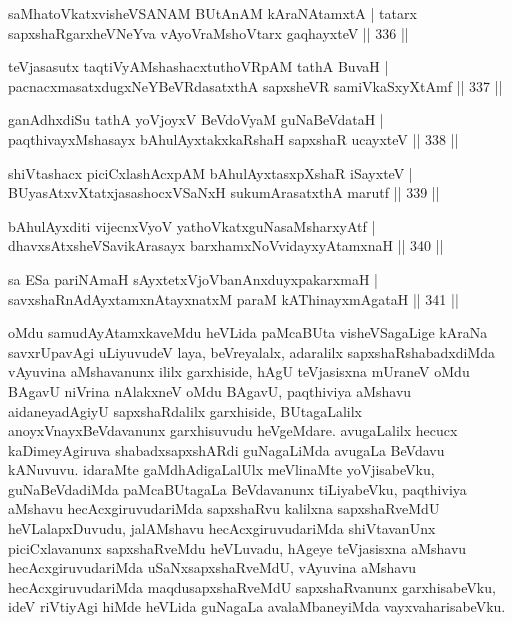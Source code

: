 \begin{shl}
saMhatoVkatxvisheVSANAM BUtAnAM kAraNAtamxtA |
tatarx sapxshaRgarxheVNeYva vAyoVraMshoV\s tarx gaqhayxteV \hfill || 336 ||
\end{shl}

\begin{shl}
teVjasasutx taqtiVyAMshashacxtuthoVR\s pAM tathA BuvaH |
pacnacxmasatxdugxNeYBeVRdasatxthA sapxsheVR samiVkaSxyXtAmf \hfill || 337 ||
\end{shl}

\begin{shl}
ganAdhxdiSu tathA yoVjoyxV BeVdoV\s yaM guNaBeVdataH |
paqthivayxMshasayx bAhulAyxtakxkaRshaH sapxshaR ucayxteV \hfill || 338 ||
\end{shl}

\begin{shl}
shiVtashacx piciCxlashAcxpAM bAhulAyxtasxpXshaR iSayxteV |
BUyasAtxvXtatxjasashocxVSaNxH sukumArasatxthA marutf \hfill || 339 ||
\end{shl}

\begin{shl}
bAhulAyxditi vijecnxVyoV yathoVkatxguNasaMsharxyAtf |
dhavxsAtxsheVSavikArasayx barxhamxNoV\s vidayxyA\s \s tamxnaH \hfill || 340 ||
\end{shl}

\begin{shl}
sa ESa pariNAmaH sAyxtetxVjoVbanAnxduyxpakarxmaH |
savxshaRnAdAyxtamxnA\s tayxnatxM paraM kAThinayxmAgataH \hfill || 341 ||
\end{shl}

\begin{artha}
oMdu samudAyAtamxkaveMdu heVLida paMcaBUta visheVSagaLige kAraNa \break savxrUpavAgi uLiyuvudeV laya, beVreyalalx, adaralilx \footnotemark[1]sapxshaRshabadxdiMda vAyu\-vina aMshavanunx ililx garxhiside, hAgU teVjasisxna mUraneV oMdu BAgavU niVrina nAlakxneV oMdu BAgavU, paqthiviya aMshavu aidaneyadAgiyU sapxshaRdalilx garxhi\-side, BUtagaLalilx anoyxVnayxBeVdavanunx garxhisuvudu heVgeMdare. avugaLalilx hecucx kaDimeyAgiruva shabadxsapxshARdi guNagaLiMda avugaLa BeVdavu kANuvuvu. idaraMte gaMdhAdigaLalUlx meVlinaMte yoVjisabeVku, guNaBeVdadiMda paMcaBUtagaLa BeVda\-vanunx tiLiyabeVku, paqthiviya aMshavu hecAcxgiruvudariMda sapxshaRvu kalilxna sapxshaR\-veMdU heVLalapxDuvudu, jalAMshavu hecAcxgiruvudariMda shiVtavanUnx piciCxlavanunx sapxshaRveMdu heVLuvadu, hAgeye teVjasisxna aMshavu hecAcxgiruvudariMda uSaNxsapxshaR\-veMdU, vAyuvina aMshavu hecAcxgiruvudariMda maqdusapxshaRveMdU sapxshaR\-vanunx garxhisabeVku, ideV riVtiyAgi hiMde heVLida guNagaLa avalaMbaneyiMda vayxvaharisa\-beVku.	
\end{artha}

